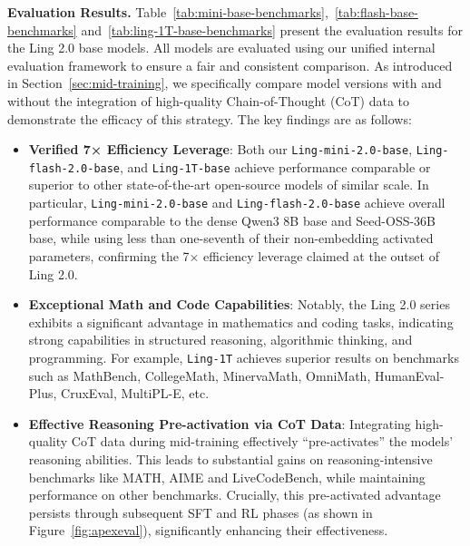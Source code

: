 \documentclass[table]{gtech}
\theoremstyle{definition}
\begin{document}
{\bfseries Evaluation Results.} 
Table~\ref{tab:mini-base-benchmarks},~\ref{tab:flash-base-benchmarks} and~\ref{tab:ling-1T-base-benchmarks} present the evaluation results for the Ling 2.0 base models. All models are evaluated using our unified internal evaluation framework to ensure a fair and consistent comparison. 
As introduced in Section~\ref{sec:mid-training}, we specifically compare model versions with and without the integration of high-quality Chain-of-Thought (CoT) data to demonstrate the efficacy of this strategy. The key findings are as follows: 
\begin{itemize}
    \item \textbf{Verified 7× Efficiency Leverage}: 
    Both our \texttt{Ling-mini-2.0-base}, \texttt{Ling-flash-2.0-base}, and \texttt{Ling-1T-base} achieve performance comparable or superior to other state-of-the-art open-source models of similar scale. 
    In particular, \texttt{Ling-mini-2.0-base} and \texttt{Ling-flash-2.0-base} achieve overall performance comparable to the dense Qwen3 8B base and Seed-OSS-36B base, while using less than one-seventh of their non-embedding activated parameters, confirming the 7× efficiency leverage claimed at the outset of Ling 2.0.
    
    \item \textbf{Exceptional Math and Code Capabilities}: 
    Notably, the Ling 2.0 series exhibits a significant advantage in mathematics and coding tasks, indicating strong capabilities in structured reasoning, algorithmic thinking, and programming. For example, \texttt{Ling-1T} achieves superior results on benchmarks such as MathBench, CollegeMath, MinervaMath, OmniMath, HumanEval-Plus, CruxEval, MultiPL-E, etc. 
    \item \textbf{Effective Reasoning Pre-activation via CoT Data}: 
    Integrating high-quality CoT data during mid-training effectively ``pre-activates'' the models' reasoning abilities. This leads to substantial gains on reasoning-intensive benchmarks like MATH, AIME and LiveCodeBench, while maintaining performance on other benchmarks. Crucially, this pre-activated advantage persists through subsequent SFT and RL phases (as shown in Figure~\ref{fig:apexeval}), significantly enhancing their effectiveness.
\end{itemize}
\end{document}
